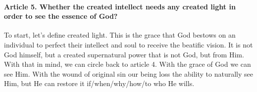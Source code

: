 \documentclass{ucetd}
\begin{document}
\paragraph{Article 5. Whether the created intellect needs any created light in order to see the essence of God?}
To start, let's define created light. This is the grace that God bestows on an individual to perfect their intellect and soul to receive the beatific vision. It is not God himself, but a created supernatural power that is not God, but from Him. With that in mind, we can circle back to article 4. With the grace of God we can see Him. With the wound of original sin our being loss the ability to naturally see Him, but He can restore it if/when/why/how/to who He wills.
\end{document}
